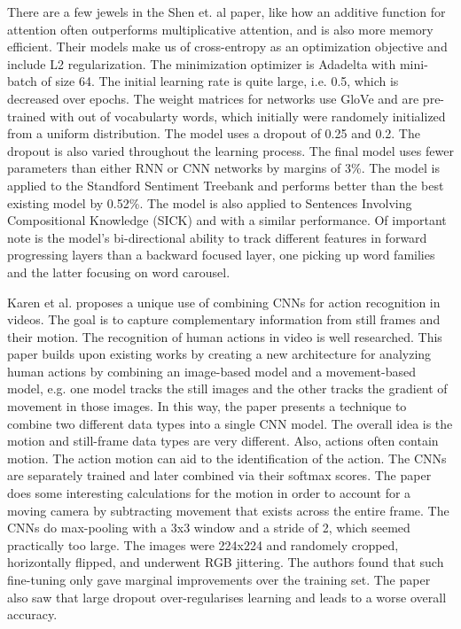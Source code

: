 There are a few jewels in the Shen et. al paper, like how an additive function for attention often outperforms multiplicative attention, and is also more memory efficient.  Their models make us of cross-entropy as an optimization objective and include L2 regularization.  The minimization optimizer is Adadelta with mini-batch of size 64.  The initial learning rate is quite large, i.e. 0.5, which is decreased over epochs.  The weight matrices for networks use GloVe and are pre-trained with out of vocabularty words, which initially were randomely initialized from a uniform distribution.  The model uses a dropout of 0.25 and 0.2.  The dropout is also varied throughout the learning process.  The final model uses fewer parameters than either RNN or CNN networks by margins of 3\%.  The model is applied to the Standford Sentiment Treebank and performs better than the best existing model by 0.52\%.  The model is also applied to Sentences Involving Compositional Knowledge (SICK) and with a similar performance.  Of important note is the model's bi-directional ability to track different features in forward progressing layers than a backward focused layer, one picking up word families and the latter focusing on word carousel.

Karen et al. proposes a unique use of combining CNNs for action recognition in videos.  The goal is to capture complementary information from still frames and their motion. The recognition of human actions in video is well researched.  This paper builds upon existing works by creating a new architecture for analyzing human actions by combining an image-based model and a movement-based model, e.g. one model tracks the still images and the other tracks the gradient of movement in those images.  In this way, the paper presents a technique to combine two different data types into a single CNN model.  The overall idea is the motion and still-frame data types are very different. Also, actions often contain motion.  The action motion can aid to the identification of the action.  The CNNs are separately trained and later combined via their softmax scores.  The paper does some interesting calculations for the motion in order to account for a moving camera by subtracting movement that exists across the entire frame.  The CNNs do max-pooling with a 3x3 window and a stride of 2, which seemed practically too large.  The images were 224x224 and randomely cropped, horizontally flipped, and underwent RGB jittering.  The authors found that such fine-tuning only gave marginal improvements over the training set.  The paper also saw that large dropout over-regularises learning and leads to a worse overall accuracy.

